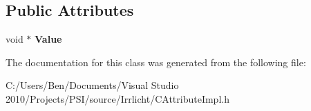 \subsection*{Public Attributes}
\begin{DoxyCompactItemize}
\item 
\hypertarget{classirr_1_1io_1_1_c_user_pointer_attribute_ab021c9dc9bd4d3d52cb7e85ac804f34a}{void $\ast$ {\bfseries Value}}\label{classirr_1_1io_1_1_c_user_pointer_attribute_ab021c9dc9bd4d3d52cb7e85ac804f34a}

\end{DoxyCompactItemize}


The documentation for this class was generated from the following file\-:\begin{DoxyCompactItemize}
\item 
C\-:/\-Users/\-Ben/\-Documents/\-Visual Studio 2010/\-Projects/\-P\-S\-I/source/\-Irrlicht/C\-Attribute\-Impl.\-h\end{DoxyCompactItemize}
